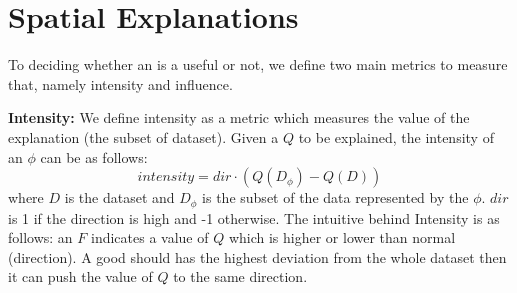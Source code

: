 
\section{Spatial Explanations}

To deciding whether an {\explanation} is a useful {\explanation} or not, we define two main metrics to measure that, namely intensity and influence. 

{\bf Intensity:} We define intensity as a metric which measures the {\fact} value of the explanation (the subset of dataset). Given a {\fact} $Q$ to be explained, the intensity of an {\explanation} $\phi$ can be as follows:
$$intensity = dir \cdot (Q (D_\phi) - Q(D)) $$
where $D$ is the dataset and $D_\phi$ is the subset of the data represented by the {\explanation} $\phi$. $dir$ is 1 if the direction is high and -1 otherwise. 
The intuitive behind Intensity is as follows: an {\fact} $F$ indicates a value of $Q$ which is higher or lower than normal (direction). A good {\explanation} should has the highest deviation from the whole dataset then it can push the value of $Q$ to the same direction. 


